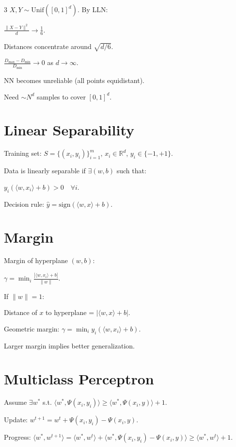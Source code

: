 \documentclass[8pt,fleqn]{extarticle}
\begin{document}
\begin{multicols}{3}
$X,Y\sim\text{Unif}([0,1]^d)$. By LLN:

$\frac{\|X-Y\|^2}{d}\to\frac16$.

Distances concentrate around $\sqrt{d/6}$.

$\frac{D_{\max}-D_{\min}}{D_{\min}}\to0$ as $d\to\infty$.

NN becomes unreliable (all points equidistant).

Need $\sim N^d$ samples to cover $[0,1]^d$.


\section*{Linear Separability}

Training set: $S=\{(x_i,y_i)\}_{i=1}^m$, $x_i\in\mathbb{R}^d$, $y_i\in\{-1,+1\}$.

Data is linearly separable if $\exists (w,b)$ such that:

$y_i(\langle w,x_i\rangle+b) > 0 \quad \forall i$.

Decision rule:
$\hat y=\text{sign}(\langle w,x\rangle+b)$.

\section*{Margin}

Margin of hyperplane $(w,b)$:

$\gamma = \min_i \frac{| \langle w,x_i\rangle + b |}{\|w\|}$.

If $\|w\|=1$:

Distance of $x$ to hyperplane = $|\langle w,x\rangle+b|$.

Geometric margin:
$\gamma = \min_i y_i(\langle w,x_i\rangle+b)$.

Larger margin implies better generalization.

\section*{Multiclass Perceptron}

Assume $\exists w^*$ s.t.
$\langle w^*,\Psi(x_i,y_i)\rangle \ge \langle w^*,\Psi(x_i,y)\rangle+1$.

Update:
$w^{t+1}=w^t+\Psi(x_i,y_i)-\Psi(x_i,y)$.

Progress:
$\langle w^*,w^{t+1}\rangle
=\langle w^*,w^t\rangle
+\langle w^*,\Psi(x_i,y_i)-\Psi(x_i,y)\rangle
\ge \langle w^*,w^t\rangle+1$.


\end{multicols}
\end{document}
